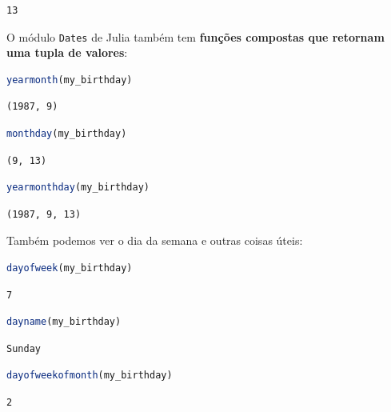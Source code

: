 \documentclass[
  notoc %
]{tufte-book}
\newcommand{\passthrough}[1]{#1}
\begin{document}
\begin{lstlisting}[language=Output]
13
\end{lstlisting}

O módulo \passthrough{\lstinline!Dates!} de Julia também tem
\textbf{funções compostas que retornam uma tupla de valores}:

\begin{lstlisting}[language=Julia]
yearmonth(my_birthday)
\end{lstlisting}

\begin{lstlisting}[language=Output]
(1987, 9)
\end{lstlisting}

\begin{lstlisting}[language=Julia]
monthday(my_birthday)
\end{lstlisting}

\begin{lstlisting}[language=Output]
(9, 13)
\end{lstlisting}

\begin{lstlisting}[language=Julia]
yearmonthday(my_birthday)
\end{lstlisting}

\begin{lstlisting}[language=Output]
(1987, 9, 13)
\end{lstlisting}

Também podemos ver o dia da semana e outras coisas úteis:

\begin{lstlisting}[language=Julia]
dayofweek(my_birthday)
\end{lstlisting}

\begin{lstlisting}[language=Output]
7
\end{lstlisting}

\begin{lstlisting}[language=Julia]
dayname(my_birthday)
\end{lstlisting}

\begin{lstlisting}[language=Output]
Sunday
\end{lstlisting}

\begin{lstlisting}[language=Julia]
dayofweekofmonth(my_birthday)
\end{lstlisting}

\begin{lstlisting}[language=Output]
2
\end{lstlisting}
\end{document}
